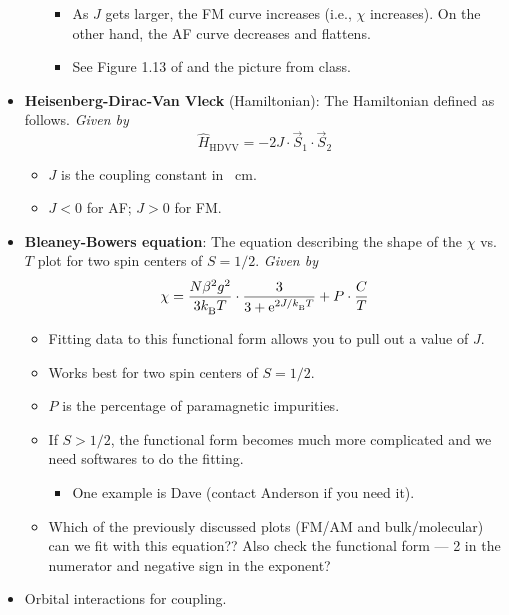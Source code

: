 \documentclass[../notes.tex]{subfiles}
\begin{document}
\begin{itemize}
\begin{itemize}
\begin{itemize}
            \item As $J$ gets larger, the FM curve increases (i.e., $\chi$ increases). On the other hand, the AF curve decreases and flattens.
            \item See Figure 1.13 of \textcite{bib:CHEM20200Notes} and the picture from class.
        \end{itemize}
    \end{itemize}
    \item \textbf{Heisenberg-Dirac-Van Vleck} (Hamiltonian): The Hamiltonian defined as follows. \emph{Given by}
    \begin{equation*}
        \hat{H}_\text{HDVV} = -2J\cdot\vec{S}_1\cdot\vec{S}_2
    \end{equation*}
    \begin{itemize}
        \item $J$ is the coupling constant in \si{\per\centi\meter}.
        \item $J<0$ for AF; $J>0$ for FM.
    \end{itemize}
    \item \textbf{Bleaney-Bowers equation}: The equation describing the shape of the $\chi$ vs. $T$ plot for two spin centers of $S=1/2$. \emph{Given by}
    \begin{equation*}
        \chi = \frac{N\beta^2g^2}{3\kB T}\cdot\frac{3}{3+\e[2J/\kB T]}+P\cdot\frac{C}{T}
    \end{equation*}
    \begin{itemize}
        \item Fitting data to this functional form allows you to pull out a value of $J$.
        \item Works best for two spin centers of $S=1/2$.
        \item $P$ is the percentage of paramagnetic impurities.
        \item If $S>1/2$, the functional form becomes much more complicated and we need softwares to do the fitting.
        \begin{itemize}
            \item One example is Dave (contact Anderson if you need it).
        \end{itemize}
        \item Which of the previously discussed plots (FM/AM and bulk/molecular) can we fit with this equation?? Also check the functional form --- 2 in the numerator and negative sign in the exponent?
    \end{itemize}
    \item Orbital interactions for coupling.

\end{itemize}
\end{document}

